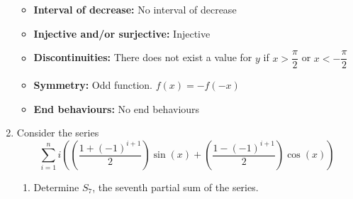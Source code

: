 \documentclass[12pt]{book}
\begin{document}
\begin{enumerate}
\begin{itemize}
    \item \textbf{Interval of decrease:} No interval of decrease
    
    \item \textbf{Injective and/or surjective:} Injective
    
    \item \textbf{Discontinuities:} There does not exist a value for $y$ if $x > \dfrac{\pi}{2}$ or $x < - \dfrac{\pi}{2}$
    
    \item \textbf{Symmetry:} Odd function. $f(x) = -f(-x)$
    
    \item \textbf{End behaviours:} No end behaviours
\end{itemize}

\newpage

\item Consider the series $$\sum\limits_{i=1}^{n} i\left(\left(\dfrac{1+(-1)^{i+1}}{2}\right)\sin(x) + \left(\dfrac{1-(-1)^{i+1}}{2}\right)\cos(x)\right)$$

\begin{enumerate}
\item Determine $S_7$, the seventh partial sum of the series. \\


\end{enumerate}
\end{enumerate}
\end{document}
